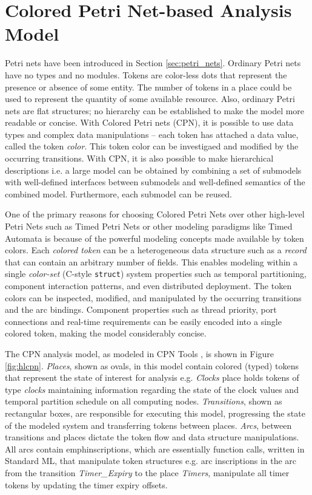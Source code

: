 \section{Colored Petri Net-based Analysis Model}

Petri nets have been introduced in Section \ref{sec:petri_nets}. Ordinary Petri nets have no types and no modules. Tokens are color-less dots that represent the presence or absence of some entity. The number of tokens in a place could be used to represent the quantity of some available resource. Also, ordinary Petri nets are flat structures; no hierarchy can be established to make the model more readable or concise. With Colored Petri nets (CPN), it is possible to use data types and complex data manipulations -- each token has attached a data value, called the token \emph{color}. This token color can be investigaed and modified by the occurring transitions. With CPN, it is also possible to make hierarchical descriptions i.e. a large model can be obtained by combining a set of submodels with well-defined interfaces between submodels and well-defined semantics of the combined model. Furthermore, each submodel can be reused. 

One of the primary reasons for choosing Colored Petri Nets over other high-level Petri Nets such as Timed Petri Nets or other modeling paradigms like Timed Automata is because of the powerful modeling concepts made available by token colors. Each \emph{colored token} can be a heterogeneous data structure such as a \emph{record} that can contain an arbitrary number of fields. This enables modeling within a single \emph{color-set} (C-style \texttt{struct}) system properties such as temporal partitioning, component interaction patterns, and even distributed deployment. The token colors can be inspected, modified, and manipulated by the occurring transitions and the arc bindings. Component properties such as thread priority, port connections and real-time requirements can be easily encoded into a single colored token, making the model considerably concise. 

The CPN analysis model, as modeled in CPN Tools \cite{CPNTools}, is shown in Figure \ref{fig:hlcpn}. \emph{Places}, shown as ovals, in this model contain colored (typed) tokens that represent the state of interest for analysis e.g. \emph{Clocks} place holds tokens of type \emph{clocks} maintaining information regarding the state of the clock values and temporal partition schedule on all computing nodes. \emph{Transitions}, shown as rectangular boxes, are responsible for executing this model, progressing the state of the modeled system and transferring tokens between places. \emph{Arcs}, between transitions and places dictate the token flow and data structure manipulations. All arcs contain emph{inscriptions}, which are essentially function calls, written in Standard ML, that manipulate token structures e.g. arc inscriptions in the arc from the transition \emph{Timer\_Expiry} to the place \emph{Timers}, manipulate all timer tokens by updating the timer expiry offsets. 


